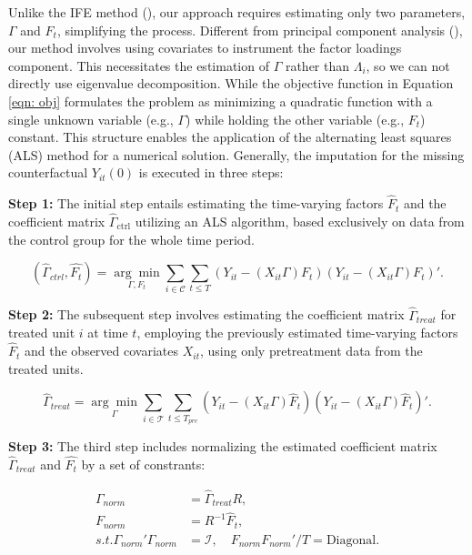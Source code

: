 \documentclass[12pt]{article}
\begin{document}
Unlike the IFE method (\cite{bai2009panel,xu2017generalized}), our approach requires estimating only two parameters, $\Gamma$ and $F_t$, simplifying the process. Different from principal component analysis (\cite{jolliffe2002principal,stock2002forecasting}), our method involves using covariates to instrument the factor loadings component. This necessitates the estimation of $\Gamma$ rather than $\Lambda_i$, so we can not directly use eigenvalue decomposition. While the objective function in Equation \ref{eqn: obj} formulates the problem as minimizing a quadratic function with a single unknown variable (e.g., $\Gamma$) while holding the other variable (e.g., $F_t$) constant. This structure enables the application of the alternating least squares (ALS) method for a numerical solution. Generally, the imputation for the missing counterfactual $Y_{it}(0)$ is executed in three steps:

\textbf{Step 1:} The initial step entails estimating the time-varying factors $\hat{F}_t$ and the coefficient matrix $\hat{\Gamma}_{\text{ctrl}}$ utilizing an ALS algorithm, based exclusively on data from the control group for the whole time period.

\begin{equation}
(\hat{\Gamma}_{ctrl}, \hat{F_t}) = \underset{\Gamma, F_t}{\arg\min} \sum_{i \in \mathcal{C}} \sum_{t \leq T}\left( Y_{it} - (X_{it}\Gamma) F_{t} \right)\left( Y_{it} - (X_{it}\Gamma) F_{t} \right)'.
\label{eq: optimization}
\end{equation}

\textbf{Step 2:} The subsequent step involves estimating the coefficient matrix $\hat{\Gamma}_{treat}$ for treated unit $i$ at time $t$, employing the previously estimated time-varying factors $\hat{F}_t$ and the observed covariates $X_{it}$, using only pretreatment data from the treated units.

\begin{equation}
\hat{\Gamma}_{treat} = \underset{\Gamma}{\arg\min} \sum_{i \in \mathcal{T}} \sum_{t \leq T_{pre}} \left( Y_{it} - (X_{it} \Gamma) \hat{F}_{t} \right) \left( Y_{it} - (X_{it} \Gamma) \hat{F}_{t} \right)'.
\end{equation}

\textbf{Step 3:} The third step includes normalizing the estimated coefficient matrix $\hat{\Gamma}_{treat}$ and $\hat{F_t}$ by a set of constrants:

\begin{equation}
\label{eqn: normalization}
\begin{aligned}
\Gamma_{norm} &= \hat{\Gamma}_{treat} R, \\
F_{norm} &= R^{-1} \hat{F}_t, \\
s.t. \Gamma_{norm}'\Gamma_{norm} &= \mathcal{I}, \quad F_{norm} F_{norm}'/T = \text{Diagonal}.
\end{aligned}
\end{equation}
\end{document}
